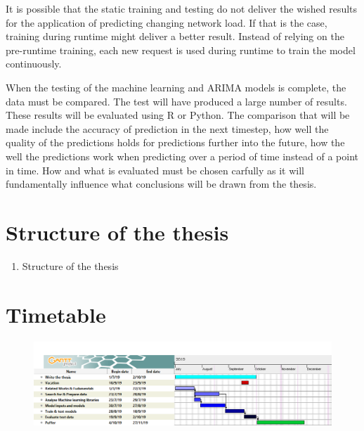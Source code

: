 \documentclass[12pt,a4paper]{article}
\begin{document}
	It is possible that the static training and testing do not deliver the wished results for the application of predicting changing network load. If that is the case, training during runtime might deliver a better result. Instead of relying on the pre-runtime training, each new request is used during runtime to train the model continuously.
	
	When the testing of the machine learning and ARIMA models is complete, the data must be compared. The test will have produced a large number of results. These results will be evaluated using R or Python. The comparison that will be made include the accuracy of prediction in the next timestep, how well the quality of the predictions holds for predictions further into the future, how the well the predictions work when predicting over a period of time instead of a point in time. How and what is evaluated must be chosen carfully as it will fundamentally influence what conclusions will be drawn from the thesis.

	\section{Structure of the thesis}
	\begin{enumerate}[label*=\arabic*.]
		\item Structure of the thesis
	\end{enumerate}
	\section{Timetable}
\begin{figure}
	\centering
	\includegraphics[width=1.0\linewidth]{Timetable/Timetable}
	\caption{}
	\label{fig:timetable}
\end{figure}


\end{document}
